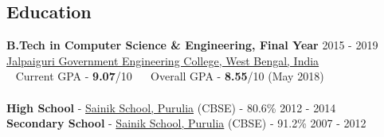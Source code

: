 \documentclass[margin, centered]{res}
\begin{document}
\begin{resume}

\section{Education}
\textbf{B.Tech in Computer Science \& Engineering, Final Year} \hfill 2015 - 2019 \\
\href{http://jgec.ac.in/}{Jalpaiguri Government Engineering College, West Bengal, India} \\
\hspace*{0.6em}\textbullet~ Current GPA - \textbf{9.07}/10 ~\textbullet~ Overall GPA - \textbf{8.55}/10 (May 2018)
\\
\\
\textbf{High School} - \href{http://sainikschoolpurulia.com/}{Sainik School, Purulia} (CBSE) - 80.6\% \hfill 2012 - 2014 \\
\textbf{Secondary School} - \href{http://sainikschoolpurulia.com/}{Sainik School, Purulia} (CBSE) - 91.2\% \hfill 2007 - 2012
 

\end{resume}
\end{document}
